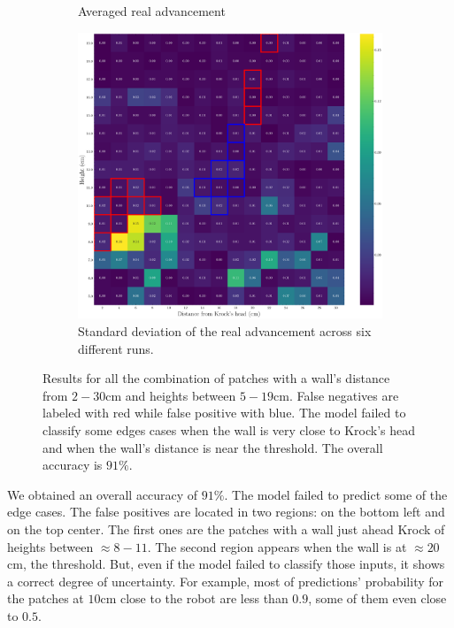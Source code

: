 \documentclass[../document.tex]{subfiles}
\begin{document}
\begin{figure}[htbp]
\begin{subfigure}[b]{0.48\linewidth}
        \caption{Averaged real advancement}
        \label{fig : walls-heights-advs}
    \end{subfigure}   
    \begin{subfigure}[b]{0.48\linewidth}
        \includegraphics[width=\linewidth]{../img/5/custom_patches/walls_heights/walls_heights_std.png}
        \caption{Standard deviation of the real advancement across six different runs.}
        \label{fig : walls-heights-std}
    \end{subfigure}   
\caption{Results for all the combination of patches with a wall's distance from $2-30$cm and heights between $5 - 19$cm. False negatives are labeled with red while false positive with blue. The model failed to classify some edges cases when the wall is very close to Krock's head and when the wall's distance is near the threshold. The overall accuracy is $91\%$.}    
\label{fig : walls-heights}
\end{figure}
We obtained an overall accuracy of $91\%$. The model failed to predict some of the edge cases. The false positives are located in two regions: on the bottom left and on the top center. The first ones are the patches with a wall just ahead Krock of heights between $\approx 8 - 11$. The second region appears when the wall is at $\approx 20$cm, the threshold. But, even if the model failed to classify those inputs, it shows a correct degree of uncertainty. For example, most of predictions' probability for the patches at $10$cm close to the robot are less than $0.9$, some of them even close to $0.5$.
\end{document}
